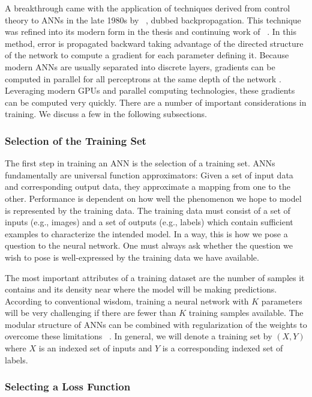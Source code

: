  A breakthrough came with the application of techniques derived from
 control theory to ANNs in the late 1980s by ~\citet{rumelhart1986learning}, dubbed backpropagation. This technique was refined into its modern form in the thesis and continuing work of ~\citet{lecun1988theoretical}. In this method, error is propagated backward taking advantage of the directed structure of the network to compute a gradient for each parameter defining it. Because modern ANNs are usually separated into discrete layers, gradients can be computed in parallel for all perceptrons at the same depth of the network
\citep{Bishop:2006:PRM:1162264}. Leveraging modern GPUs and parallel computing technologies, these gradients can be computed very quickly. There are a number of important considerations in training. We discuss a few in the following subsections. 

\subsubsection{Selection of the Training Set}

The first step in training an ANN is the selection of a training set. ANNs fundamentally are universal function approximators: Given a set of input data and corresponding output data, they approximate a mapping from one to the other. Performance is dependent on how well the phenomenon we hope to model is represented by the training data. The training data must consist of a set of inputs (e.g., images) and a set of outputs (e.g., labels) which contain sufficient examples to characterize the intended model. In a way, this is how we pose a question to the neural network. One must always ask whether the question we wish to pose is well-expressed by the training data we have available. 

The most important attributes of a training dataset are the number of
samples it contains and its density near where the model will be making predictions. According to conventional wisdom, training a neural network with $K$ parameters
will be very challenging if there are fewer than $K$ training samples
available. The modular structure of ANNs can be combined with regularization of the weights to overcome these limitations ~\citep{liu2015very}. 
In general, we will denote a training set by $(X,Y)$ where $X$ is an indexed set of inputs and $Y$ is a corresponding indexed set of labels. 

\subsubsection{Selecting a Loss Function}

